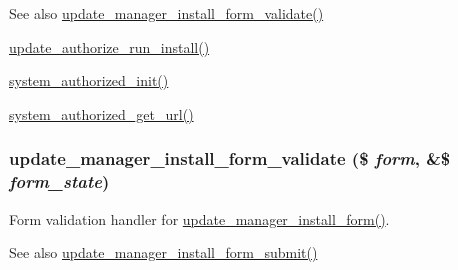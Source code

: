 \begin{DoxySeeAlso}{See also}
\hyperlink{group__update__manager__install_ga56ab9860e1bc481b261a24c6ef480f75}{update\_\-manager\_\-install\_\-form\_\-validate()} 

\hyperlink{update_8authorize_8inc_a284ce6e21de87c3f0e39bbde1a1b6556}{update\_\-authorize\_\-run\_\-install()} 

\hyperlink{group__authorize_ga17756b29805705dbea25798d6004d5dd}{system\_\-authorized\_\-init()} 

\hyperlink{group__authorize_gab59393fbd369097724650dec4be9c1dd}{system\_\-authorized\_\-get\_\-url()} 
\end{DoxySeeAlso}
\hypertarget{group__update__manager__install_ga56ab9860e1bc481b261a24c6ef480f75}{
\subsubsection[{update\_\-manager\_\-install\_\-form\_\-validate}]{\setlength{\rightskip}{0pt plus 5cm}update\_\-manager\_\-install\_\-form\_\-validate (\$ {\em form}, \/  \&\$ {\em form\_\-state})}}
\label{group__update__manager__install_ga56ab9860e1bc481b261a24c6ef480f75}
Form validation handler for \hyperlink{group__forms_ga5905518e0d54228827271f90dcd8c5c3}{update\_\-manager\_\-install\_\-form()}.

\begin{DoxySeeAlso}{See also}
\hyperlink{group__update__manager__install_ga52e9f2cddddddccf921284b01f9505b0}{update\_\-manager\_\-install\_\-form\_\-submit()} 
\end{DoxySeeAlso}
